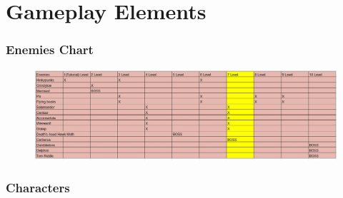\section*{Gameplay Elements}





\subsubsection*{Enemies Chart}
\begin{figure}[H]
\includegraphics[max width=\textwidth]{../Pictures/Gameplay/Enemies_chart.jpg}
\end{figure}


\pagebreak

\subsubsection*{Characters}
